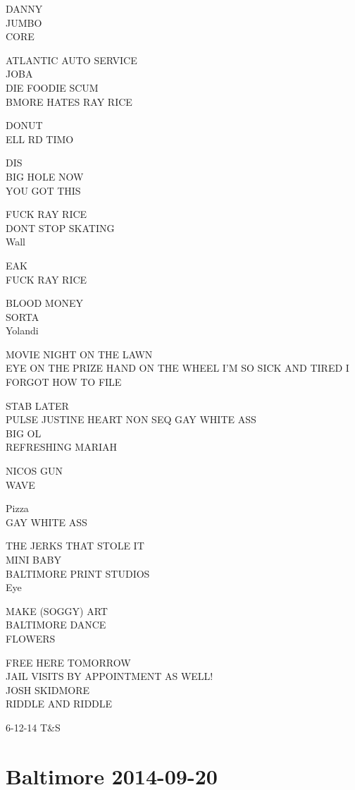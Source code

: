 \documentclass[10pt,letterpaper]{article}
\begin{document}
DANNY\\
JUMBO\\
CORE

ATLANTIC AUTO SERVICE\\
JOBA\\
DIE FOODIE SCUM\\
BMORE HATES RAY RICE

DONUT\\
ELL RD TIMO

DIS\\
BIG HOLE NOW\\
YOU GOT THIS

FUCK RAY RICE\\
DONT STOP SKATING\\
Wall

EAK\\
FUCK RAY RICE

BLOOD MONEY\\
SORTA\\
Yolandi

MOVIE NIGHT ON THE LAWN\\
EYE ON THE PRIZE HAND ON THE WHEEL I'M SO SICK AND TIRED I FORGOT HOW TO FILE

STAB LATER\\
PULSE JUSTINE HEART NON SEQ GAY WHITE ASS\\
BIG OL\\
REFRESHING MARIAH

NICOS GUN\\
WAVE

Pizza\\
GAY WHITE ASS

THE JERKS THAT STOLE IT\\
MINI BABY\\
BALTIMORE PRINT STUDIOS\\
Eye

MAKE (SOGGY) ART\\
BALTIMORE DANCE\\
FLOWERS

FREE HERE TOMORROW\\
JAIL VISITS BY APPOINTMENT AS WELL!\\
JOSH SKIDMORE\\
RIDDLE AND RIDDLE

6{-}12{-}14 T\&S


\section*{Baltimore 2014-09-20}
\end{document}
